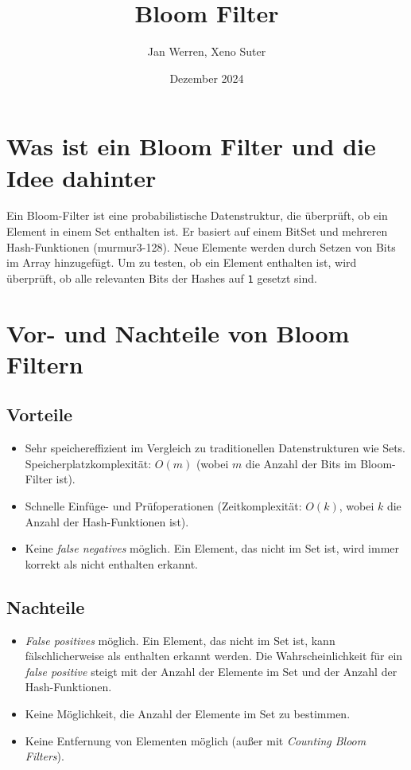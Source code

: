 \documentclass[a4paper, 12pt]{article}
\title{Bloom Filter}
\author{Jan Werren, Xeno Suter}
\date{Dezember 2024}
\begin{document}
\maketitle
\tableofcontents

\newpage

\section{Was ist ein Bloom Filter und die Idee dahinter}\label{sec:was-ist-ein-bloom-filter-und-die-idee-dahinter}
Ein Bloom-Filter ist eine probabilistische Datenstruktur, die überprüft, ob ein Element in einem Set enthalten ist.
Er basiert auf einem BitSet und mehreren Hash-Funktionen (murmur3-128). 
Neue Elemente werden durch Setzen von Bits im Array hinzugefügt.
Um zu testen, ob ein Element enthalten ist, wird überprüft, ob alle relevanten Bits der Hashes auf \texttt{1} gesetzt sind.

\section{Vor- und Nachteile von Bloom Filtern}\label{sec:vor--und-nachteile-von-bloom-filtern}

\subsection{Vorteile}\label{subsec:vorteile}
\begin{itemize}
    \item Sehr speichereffizient im Vergleich zu traditionellen Datenstrukturen wie Sets.
    Speicherplatzkomplexität: $O(m)$ (wobei $m$ die Anzahl der Bits im Bloom-Filter ist).
    \item Schnelle Einfüge- und Prüfoperationen (Zeitkomplexität: $O(k)$, wobei $k$ die Anzahl der Hash-Funktionen ist).
    \item Keine \textit{false negatives} möglich.
    Ein Element, das nicht im Set ist, wird immer korrekt als nicht enthalten erkannt.
\end{itemize}

\subsection{Nachteile}\label{subsec:nachteile}
\begin{itemize}
    \item \textit{False positives} möglich.
    Ein Element, das nicht im Set ist, kann fälschlicherweise als enthalten erkannt werden.
    Die Wahrscheinlichkeit für ein \textit{false positive} steigt mit der Anzahl der Elemente im Set und der Anzahl der Hash-Funktionen.
    \item Keine Möglichkeit, die Anzahl der Elemente im Set zu bestimmen.
    \item Keine Entfernung von Elementen möglich (außer mit \textit{Counting Bloom Filters}).
\end{itemize}
\end{document}

